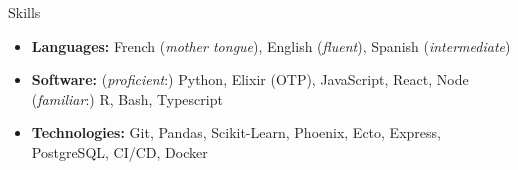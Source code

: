 \documentclass[]{mcdowellcv}
\begin{document}
    \begin{cvsection}{Skills}
        \begin{cvsubsection}{}{}{}
            \begin{itemize}
                \item \textbf{Languages:} French (\textit{mother tongue}), English (\textit{fluent}), Spanish (\textit{intermediate})
                \item \textbf{Software:} (\textit{proficient}:) Python, Elixir (OTP), JavaScript, React, Node (\textit{familiar}:) R, Bash, Typescript
                \item \textbf{Technologies:} Git, Pandas, Scikit-Learn, Phoenix, Ecto, Express, PostgreSQL, CI/CD, Docker
            \end{itemize}
        \end{cvsubsection}
    \end{cvsection}
\end{document}
